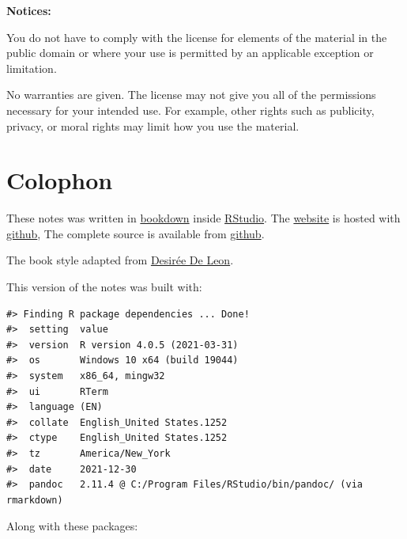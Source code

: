 \textbf{Notices:}

You do not have to comply with the license for elements of the
material in the public domain or where your use is permitted by an
applicable exception or limitation.

No warranties are given. The license may not give you all of the
permissions necessary for your intended use. For example, other rights
such as publicity, privacy, or moral rights may limit how you use the
material.

\hypertarget{colophon}{%
\chapter*{Colophon}\label{colophon}}


These notes was written in \href{http://bookdown.org/}{bookdown} inside \href{http://www.rstudio.com/ide/}{RStudio}. The \href{https://smasongarrison.github.io/syllabi}{website} is hosted with \href{https://www.github.com}{github}, The complete source is available from \href{https://github.com/smasongarrison/syllabi}{github}.

The book style adapted from \href{https://desiree.rbind.io/}{Desirée De Leon}.

This version of the notes was built with:

\begin{verbatim}
#> Finding R package dependencies ... Done!
#>  setting  value
#>  version  R version 4.0.5 (2021-03-31)
#>  os       Windows 10 x64 (build 19044)
#>  system   x86_64, mingw32
#>  ui       RTerm
#>  language (EN)
#>  collate  English_United States.1252
#>  ctype    English_United States.1252
#>  tz       America/New_York
#>  date     2021-12-30
#>  pandoc   2.11.4 @ C:/Program Files/RStudio/bin/pandoc/ (via rmarkdown)
\end{verbatim}

Along with these packages:

